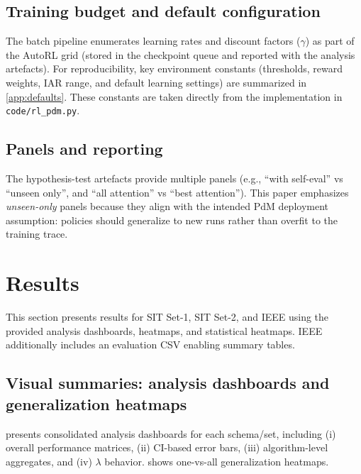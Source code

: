 \documentclass[11pt]{article}
\begin{document}
\subsection{Training budget and default configuration}
The batch pipeline enumerates learning rates and discount factors ($\gamma$) as part of the AutoRL grid (stored in the checkpoint queue and reported with the analysis artefacts). For reproducibility, key environment constants (thresholds, reward weights, IAR range, and default learning settings) are summarized in \cref{app:defaults}. These constants are taken directly from the implementation in \texttt{code/rl\_pdm.py}.

\subsection{Panels and reporting}
The hypothesis-test artefacts provide multiple panels (e.g., ``with self-eval'' vs ``unseen only'', and ``all attention'' vs ``best attention''). This paper emphasizes \emph{unseen-only} panels because they align with the intended PdM deployment assumption: policies should generalize to new runs rather than overfit to the training trace.

\section{Results}
\label{sec:results}
This section presents results for SIT Set-1, SIT Set-2, and IEEE using the provided analysis dashboards, heatmaps, and statistical heatmaps. IEEE additionally includes an evaluation CSV enabling summary tables.

\subsection{Visual summaries: analysis dashboards and generalization heatmaps}
 presents consolidated analysis dashboards for each schema/set, including (i) overall performance matrices, (ii) CI-based error bars, (iii) algorithm-level aggregates, and (iv) $\lambda$ behavior.  shows one-vs-all generalization heatmaps.
\end{document}
